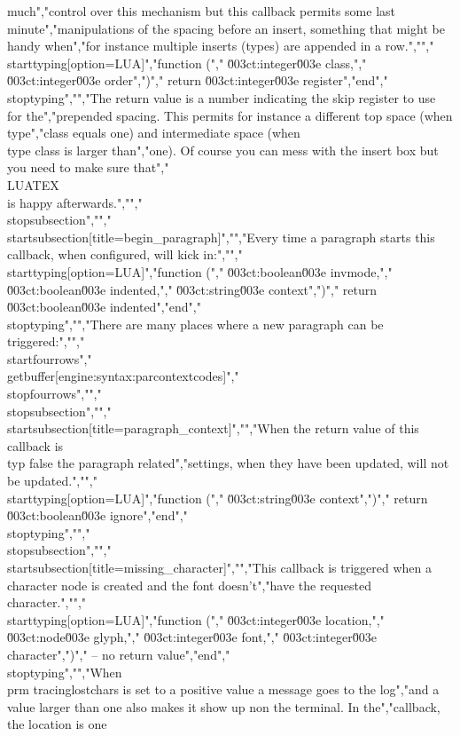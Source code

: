 much","control over this mechanism but this callback permits some last minute","manipulations of the spacing before an insert, something that might be handy when","for instance multiple inserts (types) are appended in a row.","","\\starttyping[option=LUA]","function (","    \u003ct:integer\u003e class,","    \u003ct:integer\u003e order",")","    return \u003ct:integer\u003e register","end","\\stoptyping","","The return value is a number indicating the skip register to use for the","prepended spacing. This permits for instance a different top space (when \\type","{class} equals one) and intermediate space (when \\type {class} is larger than","one). Of course you can mess with the insert box but you need to make sure that","\\LUATEX\\ is happy afterwards.","","\\stopsubsection","","\\startsubsection[title=begin_paragraph]","","Every time a paragraph starts this callback, when configured, will kick in:","","\\starttyping[option=LUA]","function (","    \u003ct:boolean\u003e invmode,","    \u003ct:boolean\u003e indented,","    \u003ct:string\u003e  context",")","    return \u003ct:boolean\u003e indented","end","\\stoptyping","","There are many places where a new paragraph can be triggered:","","\\startfourrows","\\getbuffer[engine:syntax:parcontextcodes]","\\stopfourrows","","\\stopsubsection","","\\startsubsection[title=paragraph_context]","","When the return value of this callback is \\typ {false} the paragraph related","settings, when they have been updated, will not be updated.","","\\starttyping[option=LUA]","function (","    \u003ct:string\u003e context",")","    return \u003ct:boolean\u003e ignore","end","\\stoptyping","","\\stopsubsection","","\\startsubsection[title=missing_character]","","This callback is triggered when a character node is created and the font doesn't","have the requested character.","","\\starttyping[option=LUA]","function (","    \u003ct:integer\u003e location,","    \u003ct:node\u003e    glyph,","    \u003ct:integer\u003e font,","    \u003ct:integer\u003e character",")","    -- no return value","end","\\stoptyping","","When \\prm {tracinglostchars} is set to a positive value a message goes to the log","and a value larger than one also makes it show up non the terminal. In the","callback, the location is one 